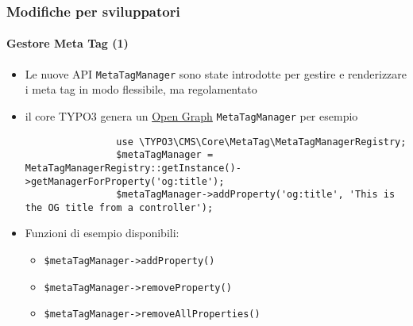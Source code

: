 
\begin{frame}[fragile]
	\frametitle{Modifiche per sviluppatori}
	\framesubtitle{Gestore Meta Tag (1)}

	\lstset{basicstyle=\tiny\ttfamily}

	\begin{itemize}
		\item Le nuove API \texttt{MetaTagManager} sono state introdotte per gestire e
			renderizzare i meta tag in modo flessibile, ma regolamentato
		\item il core TYPO3 genera un \href{http://ogp.me/}{Open Graph}
			\texttt{MetaTagManager} per esempio

			\begin{lstlisting}
				use \TYPO3\CMS\Core\MetaTag\MetaTagManagerRegistry;
				$metaTagManager = MetaTagManagerRegistry::getInstance()->getManagerForProperty('og:title');
				$metaTagManager->addProperty('og:title', 'This is the OG title from a controller');
			\end{lstlisting}

		\item Funzioni di esempio disponibili:

			\begin{itemize}
				\smaller
					\item \texttt{\$metaTagManager->addProperty()}
					\item \texttt{\$metaTagManager->removeProperty()}
					\item \texttt{\$metaTagManager->removeAllProperties()}
			\end{itemize}

	\end{itemize}

\end{frame}


